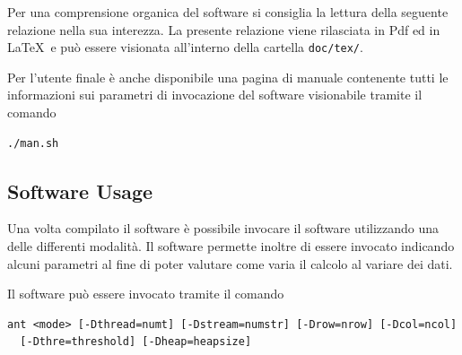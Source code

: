 \documentclass[a4paper,10pt]{article}
\begin{document}
Per una comprensione organica del software si consiglia la lettura della seguente relazione nella sua interezza. La presente relazione viene rilasciata in Pdf ed in \LaTeX\ e pu\`o essere visionata all'interno della cartella \texttt{doc/tex/}.


Per l'utente finale \`e anche disponibile una pagina di manuale contenente tutti le informazioni sui parametri di invocazione del software visionabile tramite il comando
\begin{lstlisting}
./man.sh
\end{lstlisting}

\subsection{Software Usage}

Una volta compilato il software \`e possibile invocare il software utilizzando una delle differenti modalit\`a. Il software permette inoltre di essere invocato indicando alcuni parametri al fine di poter valutare come varia il calcolo al variare dei dati.

Il software pu\`o essere invocato tramite il comando
\begin{lstlisting}
ant <mode> [-Dthread=numt] [-Dstream=numstr] [-Drow=nrow] [-Dcol=ncol]
  [-Dthre=threshold] [-Dheap=heapsize]
\end{lstlisting}
\end{document}
